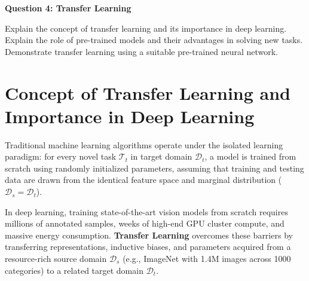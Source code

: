 \documentclass[12pt,a4paper]{article}
\begin{document}
{\noindent\LARGE\textbf{Question 4: Transfer Learning}}\par
\vspace{0.8em}
\noindent Explain the concept of transfer learning and its importance in deep learning. Explain the role of pre-trained models and their advantages in solving new tasks. Demonstrate transfer learning using a suitable pre-trained neural network.
\par\vspace{1.2em}

\section{Concept of Transfer Learning and Importance in Deep Learning}
Traditional machine learning algorithms operate under the isolated learning paradigm: for every novel task $\mathcal{T}_t$ in target domain $\mathcal{D}_t$, a model is trained from scratch using randomly initialized parameters, assuming that training and testing data are drawn from the identical feature space and marginal distribution ($\mathcal{D}_s = \mathcal{D}_t$). 

In deep learning, training state-of-the-art vision models from scratch requires millions of annotated samples, weeks of high-end GPU cluster compute, and massive energy consumption. \textbf{Transfer Learning} overcomes these barriers by transferring representations, inductive biases, and parameters acquired from a resource-rich source domain $\mathcal{D}_s$ (e.g., ImageNet with 1.4M images across 1000 categories) to a related target domain $\mathcal{D}_t$.

\begin{center}
\end{center}
\end{document}
